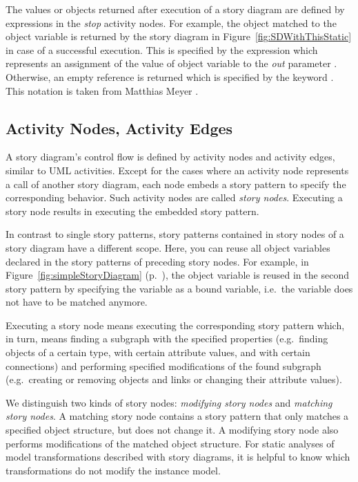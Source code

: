 The values or objects returned after execution of a story diagram are defined by expressions in the \emph{stop} activity nodes.
For example, the object matched to the object variable  is returned by the story diagram in Figure~\ref{fig:SDWithThisStatic} in case of a successful execution.
This is specified by the expression  which represents an assignment of the value of object variable  to the \emph{out} parameter .
Otherwise, an empty reference is returned which is specified by the keyword .
This notation is taken from Matthias Meyer \cite{Mey09}.

\subsection{Activity Nodes, Activity Edges} 
\label{sec:storydiagrams:activitynodes}

A story diagram's control flow is defined by activity nodes and activity edges, similar to UML activities.
Except for the cases where an activity node represents a call of another story diagram,
each node embeds a story pattern to specify the corresponding behavior.
Such activity nodes are called \emph{story nodes}.
Executing a story node results in executing the embedded story pattern.

In contrast to single story patterns, story patterns contained in story nodes of a story diagram have a different scope.
Here, you can reuse all object variables declared in the story patterns of preceding story nodes.
For example, in Figure~\ref{fig:simpleStoryDiagram} (p.~\pageref{fig:simpleStoryDiagram}),
the object variable  is reused in the second story pattern
by specifying the variable as a bound variable, i.e.\ the variable does not have to be matched anymore.

Executing a story node means executing the corresponding story pattern
which, in turn, means finding a subgraph with the specified properties
(e.g.\ finding objects of a certain type, with certain attribute values, and with certain connections)
and performing specified modifications of the found subgraph
(e.g.\ creating or removing objects and links or changing their attribute values).

We distinguish two kinds of story nodes: \emph{modifying story nodes} and \emph{matching story nodes}.
A matching story node contains a story pattern that only matches a specified object structure, but does not change it.
A modifying story node also performs modifications of the matched object structure.
For static analyses of model transformations described with story diagrams,
it is helpful to know which transformations do not modify the instance model.

